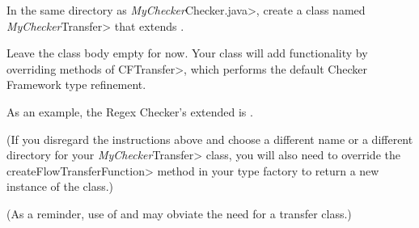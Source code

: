 
In the same directory as \<\emph{MyChecker}Checker.java>, create a class
named \<\emph{MyChecker}Transfer> that extends
.

Leave the class body empty for now.  Your class will add functionality by
overriding methods of \<CFTransfer>, which performs the default Checker
Framework type refinement.

As an example, the Regex Checker's extended
 is
.

(If you disregard the instructions above and choose a different name or a
different directory for your \<\emph{MyChecker}Transfer> class, you will
also need to override the \<createFlowTransferFunction> method in your type
factory to return a new instance of the class.)

(As a reminder, use of  and
 may obviate the need for
a transfer class.)

%

